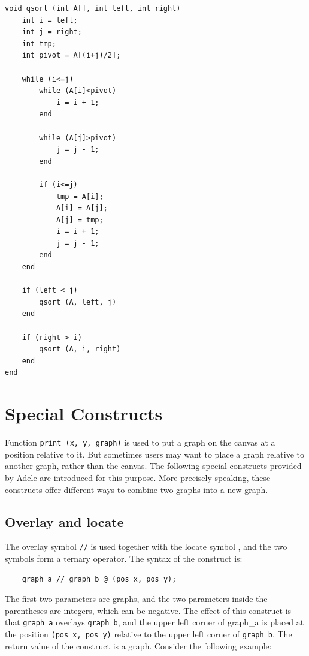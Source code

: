 \documentclass[11pt,letterpaper]{article}
\begin{document}
\begin{lstlisting}[caption=qsort.adele, label=qsort, captionpos=b, frame=single, tabsize=4]
void qsort (int A[], int left, int right)
	int i = left;
	int j = right;
	int tmp;
	int pivot = A[(i+j)/2];

	while (i<=j)
		while (A[i]<pivot)
			i = i + 1;
		end
  		
		while (A[j]>pivot)
			j = j - 1;
		end
  		
  		if (i<=j)
			tmp = A[i];
			A[i] = A[j];
			A[j] = tmp;
			i = i + 1;
			j = j - 1;
		end
	end

	if (left < j)
  		qsort (A, left, j)
	end

	if (right > i)
  		qsort (A, i, right)
	end
end
\end{lstlisting}


\section {Special Constructs}

Function \texttt{print (x, y, graph)} is used to put a graph on the canvas at a position relative to it. But sometimes users may want to place a graph relative to another graph, rather than the canvas. The following special constructs provided by Adele are introduced for this purpose. More precisely speaking, these constructs offer different ways to combine two graphs into a new graph.

\subsection {Overlay and locate}

The overlay symbol \texttt{//} is used together with the locate symbol \texttt{\@}, and the two symbols form a ternary operator. The syntax of the construct is:

\begin{lstlisting}
    graph_a // graph_b @ (pos_x, pos_y);
\end{lstlisting}

The first two parameters are graphs, and the two parameters inside the parentheses are integers, which can be negative. The effect of this construct is that \texttt{graph\_a} overlays \texttt{graph\_b}, and the upper left corner of graph\_a is placed at the position \texttt{(pos\_x, pos\_y)} relative to the upper left corner of \texttt{graph\_b}. The return value of the construct is a graph. Consider the following example:
\end{document}
